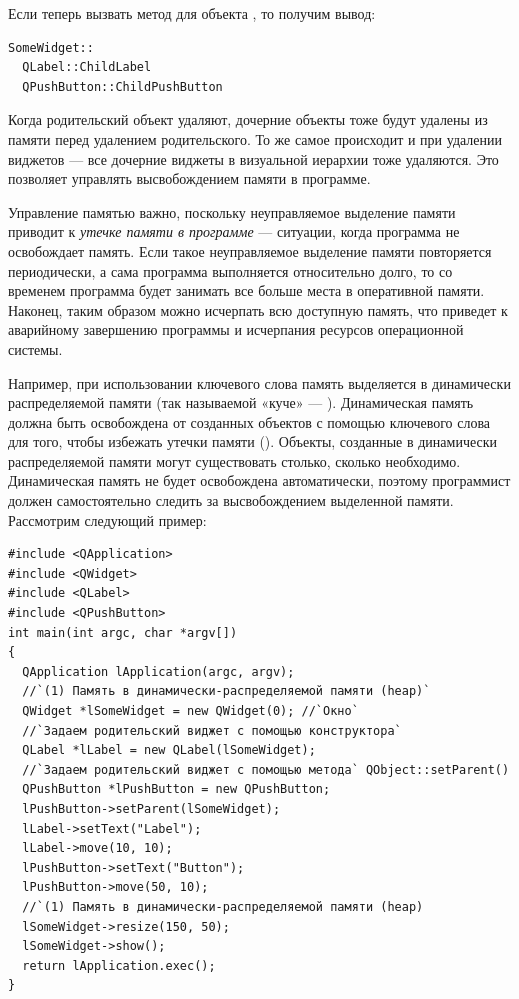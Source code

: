 Если теперь вызвать метод  для объекта , то получим вывод:
\begin{lstlisting}
SomeWidget:: 
  QLabel::ChildLabel 
  QPushButton::ChildPushButton 
\end{lstlisting}

Когда родительский объект удаляют, дочерние объекты тоже будут удалены из памяти перед удалением родительского. То же
самое происходит и при удалении виджетов --- все дочерние виджеты в визуальной иерархии тоже удаляются. Это позволяет
управлять высвобождением памяти в программе.

Управление памятью важно, поскольку неуправляемое выделение памяти приводит к \emph{утечке памяти
в программе} --- ситуации, когда программа не освобождает память. Если такое неуправляемое выделение памяти повторяется
периодически, а сама программа выполняется относительно долго, то со временем программа будет занимать все больше места
в оперативной памяти. Наконец, таким образом можно исчерпать всю доступную память, что приведет к аварийному завершению
программы и исчерпания ресурсов операционной системы.

Например, при использовании ключевого слова  память выделяется в динамически распределяемой памяти (так называемой «куче» --- ). Динамическая память должна быть
освобождена от созданных объектов с помощью ключевого слова  для того, чтобы избежать утечки памяти
(). Объекты, созданные в динамически распределяемой памяти могут существовать столько, сколько
необходимо. Динамическая память не будет освобождена автоматически, поэтому программист должен самостоятельно следить
за высвобождением выделенной памяти. Рассмотрим следующий пример:
\begin{lstlisting}
#include <QApplication>
#include <QWidget>
#include <QLabel>
#include <QPushButton>
int main(int argc, char *argv[])
{
  QApplication lApplication(argc, argv);
  //`(1) Память в динамически-распределяемой памяти (heap)`
  QWidget *lSomeWidget = new QWidget(0); //`Окно`
  //`Задаем родительский виджет с помощью конструктора`
  QLabel *lLabel = new QLabel(lSomeWidget);
  //`Задаем родительский виджет с помощью метода` QObject::setParent()
  QPushButton *lPushButton = new QPushButton;
  lPushButton->setParent(lSomeWidget);
  lLabel->setText("Label");
  lLabel->move(10, 10);
  lPushButton->setText("Button");
  lPushButton->move(50, 10);
  //`(1) Память в динамически-распределяемой памяти (heap)
  lSomeWidget->resize(150, 50);
  lSomeWidget->show();
  return lApplication.exec();
}
\end{lstlisting}

